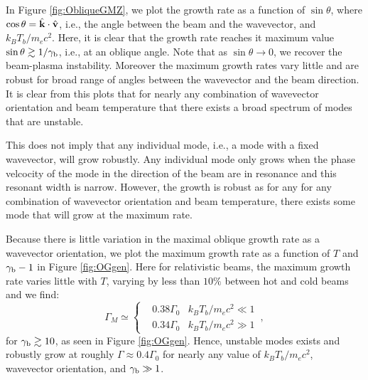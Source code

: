\documentclass[usenatbib,iop,apj,numberedappendix]{aeb_emulateapj_2015}
\newcommand\bmath[1] {\mbox{\boldmath$\rm #1$}}
\newcommand{\vel}{\ensuremath{\bmath{v}}}
\newcommand{\kvec}{\ensuremath{\bmath{k}}}
\newcommand{\gammabeam}{\ensuremath{\gamma_{\rm b}}}
\begin{document}
In Figure \ref{fig:ObliqueGMZ}, we plot the growth rate as a function of
$\sin\theta$, where $\cos\theta = \hat{\kvec}\cdot\hat{\vel}$, i.e., the angle between the
beam and the wavevector, and $k_BT_b/m_e c^2$.  Here, it is clear that the growth
rate reaches it maximum value $\sin\theta \gtrsim1/\gammabeam$, i.e., at an oblique angle.  Note that as $\sin\theta \rightarrow 0$, we recover the beam-plasma instability.  Moreover the maximum growth rates vary little and are
robust for broad range of angles between the wavevector and the beam direction.  It is clear from this plots that for nearly any combination of wavevector orientation and beam temperature that there exists a broad spectrum of modes that are unstable. 

This does not imply that any individual mode, i.e., a mode with a fixed wavevector, will grow robustly.  Any individual mode only grows when the phase velcocity of the mode in the direction of the beam are in resonance and this resonant width is narrow.  However, the growth is robust as for any for any combination of wavevector orientation and beam temperature, there exists some mode that will grow at the maximum rate. 

Because there is little variation in the maximal oblique growth rate as a wavevector orientation, we plot the maximum growth rate as a function of $T$
and $\gammabeam - 1$ in Figure \ref{fig:OGgen}.  Here for relativistic beams, the maximum growth rate varies
little with $T$, varying by less than $10\%$ between hot and cold beams and 
we find:
\begin{equation}
\Gamma_M
\simeq
\left\{
\begin{aligned}
& 0.38 \Gamma_0 & k_BT_b/m_ec^2\ll 1\\
& 0.34 \Gamma_0 & k_BT_b/m_ec^2\gg 1
\end{aligned}
\right.\,,
\end{equation}
for $\gammabeam\gtrsim10$, as seen in Figure \ref{fig:OGgen}.  Hence, unstable modes exists and robustly grow at roughly $\Gamma \approx 0.4\Gamma_0$ for nearly any value of $k_BT_b/m_ec^2$, wavevector orientation, and $\gammabeam \gg 1$. 
\end{document}
